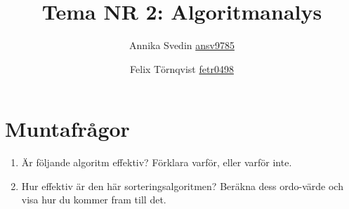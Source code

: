 \documentclass[a5paper,10pt,oneside]{article}
\title{Tema NR 2: Algoritmanalys}
\author{Annika Svedin \url{ansv9785} \and Felix Törnqvist \url{fetr0498}}
\begin{document}
\maketitle

\section*{Muntafrågor}

\begin{enumerate}

\item Är följande algoritm effektiv? Förklara varför, eller varför inte. 




\item Hur effektiv är den här sorteringsalgoritmen? Beräkna dess ordo-värde och visa hur du kommer fram till det.









\end{enumerate}
\end{document}

